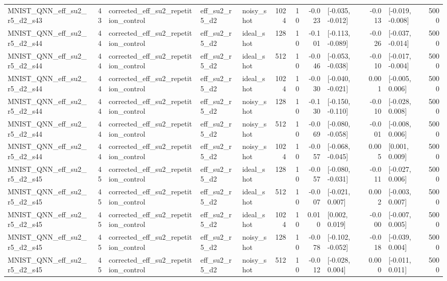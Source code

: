 \begin{table}[t]
\begin{tabular}{lrlllrrrlrlr}
MNIST\_QNN\_eff\_su2\_r5\_d2\_s43 & 43 & corrected\_eff\_su2\_repetition\_control & eff\_su2\_r5\_d2 & noisy\_shot & 1024 & 10 & -0.023 & [-0.035, -0.012] & -0.013 & [-0.019, -0.008] & 5000 \\
MNIST\_QNN\_eff\_su2\_r5\_d2\_s44 & 44 & corrected\_eff\_su2\_repetition\_control & eff\_su2\_r5\_d2 & ideal\_shot & 128 & 10 & -0.101 & [-0.113, -0.089] & -0.026 & [-0.037, -0.014] & 5000 \\
MNIST\_QNN\_eff\_su2\_r5\_d2\_s44 & 44 & corrected\_eff\_su2\_repetition\_control & eff\_su2\_r5\_d2 & ideal\_shot & 512 & 10 & -0.046 & [-0.053, -0.038] & -0.010 & [-0.017, -0.004] & 5000 \\
MNIST\_QNN\_eff\_su2\_r5\_d2\_s44 & 44 & corrected\_eff\_su2\_repetition\_control & eff\_su2\_r5\_d2 & ideal\_shot & 1024 & 10 & -0.030 & [-0.040, -0.021] & 0.001 & [-0.005, 0.006] & 5000 \\
MNIST\_QNN\_eff\_su2\_r5\_d2\_s44 & 44 & corrected\_eff\_su2\_repetition\_control & eff\_su2\_r5\_d2 & noisy\_shot & 128 & 10 & -0.130 & [-0.150, -0.110] & -0.010 & [-0.028, 0.008] & 5000 \\
MNIST\_QNN\_eff\_su2\_r5\_d2\_s44 & 44 & corrected\_eff\_su2\_repetition\_control & eff\_su2\_r5\_d2 & noisy\_shot & 512 & 10 & -0.069 & [-0.080, -0.058] & -0.001 & [-0.008, 0.006] & 5000 \\
MNIST\_QNN\_eff\_su2\_r5\_d2\_s44 & 44 & corrected\_eff\_su2\_repetition\_control & eff\_su2\_r5\_d2 & noisy\_shot & 1024 & 10 & -0.057 & [-0.068, -0.045] & 0.005 & [0.001, 0.009] & 5000 \\
MNIST\_QNN\_eff\_su2\_r5\_d2\_s45 & 45 & corrected\_eff\_su2\_repetition\_control & eff\_su2\_r5\_d2 & ideal\_shot & 128 & 10 & -0.057 & [-0.080, -0.031] & -0.011 & [-0.027, 0.006] & 5000 \\
MNIST\_QNN\_eff\_su2\_r5\_d2\_s45 & 45 & corrected\_eff\_su2\_repetition\_control & eff\_su2\_r5\_d2 & ideal\_shot & 512 & 10 & -0.007 & [-0.021, 0.007] & 0.002 & [-0.003, 0.007] & 5000 \\
MNIST\_QNN\_eff\_su2\_r5\_d2\_s45 & 45 & corrected\_eff\_su2\_repetition\_control & eff\_su2\_r5\_d2 & ideal\_shot & 1024 & 10 & 0.010 & [0.002, 0.019] & -0.000 & [-0.007, 0.005] & 5000 \\
MNIST\_QNN\_eff\_su2\_r5\_d2\_s45 & 45 & corrected\_eff\_su2\_repetition\_control & eff\_su2\_r5\_d2 & noisy\_shot & 128 & 10 & -0.078 & [-0.102, -0.052] & -0.018 & [-0.039, 0.004] & 5000 \\
MNIST\_QNN\_eff\_su2\_r5\_d2\_s45 & 45 & corrected\_eff\_su2\_repetition\_control & eff\_su2\_r5\_d2 & noisy\_shot & 512 & 10 & -0.012 & [-0.028, 0.004] & 0.000 & [-0.011, 0.011] & 5000 \\

\end{tabular}
\end{table}
